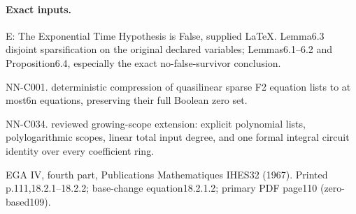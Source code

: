 \paragraph{Exact inputs.}
E: The Exponential Time Hypothesis is False, supplied LaTeX. Lemma6.3 disjoint sparsification on the original declared variables; Lemmas6.1--6.2 and Proposition6.4, especially the exact no-false-survivor conclusion.

NN-C001. deterministic compression of quasilinear sparse F2 equation lists to at most6n equations, preserving their full Boolean zero set.

NN-C034. reviewed growing-scope extension: explicit polynomial lists, polylogarithmic scopes, linear total input degree, and one formal integral circuit identity over every coefficient ring.

EGA IV, fourth part, Publications Mathematiques IHES32 (1967). Printed p.111,18.2.1--18.2.2; base-change equation18.2.1.2; primary PDF page110 (zero-based109).

